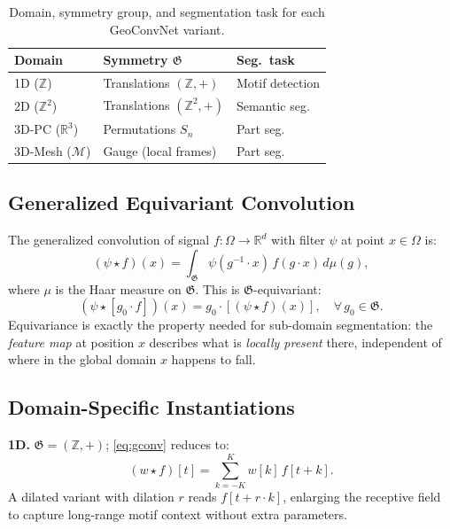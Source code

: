 \documentclass[10pt,conference]{IEEEtran}
\newcommand{\R}{\mathbb{R}}
\newcommand{\Z}{\mathbb{Z}}
\newcommand{\fG}{\mathfrak{G}}
\begin{document}
\begin{table}[t]
  \renewcommand{\arraystretch}{1.2}
  \caption{Domain, symmetry group, and segmentation task for each GeoConvNet variant.}
  \label{tab:symmetry}
  \centering
  \begin{tabular}{lll}
    \toprule
    \textbf{Domain} & \textbf{Symmetry $\fG$} & \textbf{Seg.\ task} \\
    \midrule
    1D ($\Z$)         & Translations $(\Z,+)$      & Motif detection    \\
    2D ($\Z^2$)       & Translations $(\Z^2,+)$    & Semantic seg.      \\
    3D-PC ($\R^3$)    & Permutations $S_n$         & Part seg.          \\
    3D-Mesh ($\mathcal{M}$) & Gauge (local frames) & Part seg.    \\
    \bottomrule
  \end{tabular}
\end{table}

\subsection{Generalized Equivariant Convolution}

The generalized convolution of signal $f\colon\Omega\to\R^d$ with filter
$\psi$ at point $x\in\Omega$ is:
\begin{equation}
  (\psi \star f)(x)
    = \int_{\fG} \psi(g^{-1}\!\cdot x)\,f(g\cdot x)\,d\mu(g),
  \label{eq:gconv}
\end{equation}
where $\mu$ is the Haar measure on $\fG$.  This is $\fG$-equivariant:
\begin{equation}
  (\psi \star [g_0\cdot f])(x) = g_0 \cdot [(\psi \star f)(x)],
  \quad \forall\, g_0\in\fG.
  \label{eq:equiv}
\end{equation}
Equivariance is exactly the property needed for sub-domain segmentation:
the \emph{feature map} at position $x$ describes what is \emph{locally
present} there, independent of where in the global domain $x$ happens to
fall.

\subsection{Domain-Specific Instantiations}

\noindent\textbf{1D.}  $\fG{=}(\Z,+)$; \eqref{eq:gconv} reduces to:
\begin{equation}
  (w\star f)[t] = \sum_{k=-K}^{K} w[k]\,f[t+k].
  \label{eq:conv1d}
\end{equation}
A dilated variant with dilation $r$ reads $f[t + r\cdot k]$, enlarging
the receptive field to capture long-range motif context without extra parameters.
\end{document}
